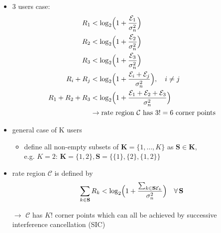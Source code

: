 \documentclass[a4paper, 10pt]{article}
\begin{document}
\begin{itemize}
\begin{itemize}
	\end{itemize}
	\item 3 users case:
	\begin{align*}
		R_1 &< \log_2\Bigl(1 + \frac{\mathcal{E}_1}{\sigma_n^2}\Bigr)\\
		R_2 &< \log_2\Bigl(1 + \frac{\mathcal{E}_2}{\sigma_n^2}\Bigr)\\
		R_3 &< \log_2\Bigl(1 + \frac{\mathcal{E}_3}{\sigma_n^2}\Bigr)\\
		R_i + R_j &< \log_2\Bigl(1 + \frac{\mathcal{E}_i + \mathcal{E}_j}{\sigma_n^2}\Bigr),\quad i\neq j\\
		R_1 + R_2 + R_3 &< \log_2\Bigl(1 + \frac{\mathcal{E}_1 + \mathcal{E}_2 + \mathcal{E}_3}{\sigma_n^2}\Bigr)\\
		&\rightarrow \text{rate region } \mathbf{\mathcal{C}} \text{ has } 3! = 6 \text{ corner points}
	\end{align*}
	\item general case of K users
	\begin{itemize}
		\item define all non-empty subsets of $\mathbf{K} = \bigl\{1,\ldots, K\bigr\} $ as $ \mathbf{S} \in \mathbf{K}$,\\  e.g. $K = 2$: $\mathbf{K} = \bigl\{1, 2\bigr\}, \mathbf{S} = \bigl\{\{1\}, \{2\}, \{1, 2\}\bigr\} $ 
	\end{itemize}
	\item rate region $\mathbf{\mathcal{C}} $  is defined by
	\begin{align*}
		\sum_{k \in \mathbf{S}}R_k < \log_2\Bigl(1 + \frac{\sum_{k\in\mathbf{S}\mathcal{E}_k}}{\sigma_n^2}\Bigr)\quad\forall\, \mathbf{S}
	\end{align*}
	\item[$\rightarrow$] $\mathbf{\mathcal{C}} $  has $ K! $ corner points which can all be achieved by successive interference cancellation (SIC) 
\end{itemize}
\end{document}

